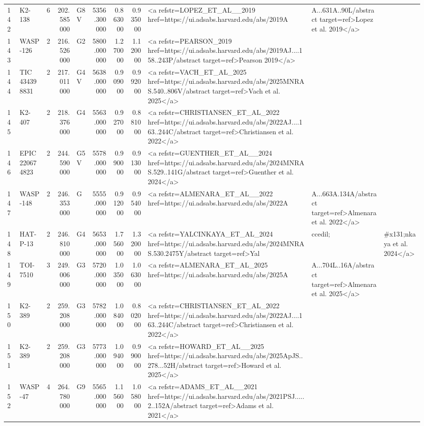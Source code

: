 \begin{tabular}{llrrlrrrl}
142 & K2-138 & 6 & 202.585000 & G8 V & 5356.300000 & 0.863000 & 0.935000 & <a refstr=LOPEZ_ET_AL__2019 href=https://ui.adsabs.harvard.edu/abs/2019A&A...631A..90L/abstract target=ref>Lopez et al. 2019</a> \\
143 & WASP-126 & 2 & 216.526000 & G2 & 5800.000000 & 1.270000 & 1.120000 & <a refstr=PEARSON_2019 href=https://ui.adsabs.harvard.edu/abs/2019AJ....158..243P/abstract target=ref>Pearson 2019</a> \\
144 & TIC 434398831 & 2 & 217.011000 & G4 V & 5638.000000 & 0.909000 & 0.992000 & <a refstr=VACH_ET_AL_2025 href=https://ui.adsabs.harvard.edu/abs/2025MNRAS.540..806V/abstract target=ref>Vach et al. 2025</a> \\
145 & K2-407 & 2 & 218.376000 & G4 & 5563.000000 & 0.927000 & 0.881000 & <a refstr=CHRISTIANSEN_ET_AL_2022 href=https://ui.adsabs.harvard.edu/abs/2022AJ....163..244C/abstract target=ref>Christiansen et al. 2022</a> \\
146 & EPIC 220674823 & 2 & 244.590000 & G5 V & 5578.000000 & 0.990000 & 0.913000 & <a refstr=GUENTHER_ET_AL__2024 href=https://ui.adsabs.harvard.edu/abs/2024MNRAS.529..141G/abstract target=ref>Guenther et al. 2024</a> \\
147 & WASP-148 & 2 & 246.353000 & G & 5555.000000 & 0.912000 & 0.954000 & <a refstr=ALMENARA_ET_AL__2022 href=https://ui.adsabs.harvard.edu/abs/2022A&A...663A.134A/abstract target=ref>Almenara et al. 2022</a> \\
148 & HAT-P-13 & 2 & 246.810000 & G4 & 5653.000000 & 1.756000 & 1.320000 & <a refstr=YALCINKAYA_ET_AL_2024 href=https://ui.adsabs.harvard.edu/abs/2024MNRAS.530.2475Y/abstract target=ref>Yal&ccedil;&#x131;nkaya et al. 2024</a> \\
149 & TOI-7510 & 3 & 249.006000 & G3 & 5720.000000 & 1.035000 & 1.063000 & <a refstr=ALMENARA_ET_AL_2025 href=https://ui.adsabs.harvard.edu/abs/2025A&A...704L..16A/abstract target=ref>Almenara et al. 2025</a> \\
150 & K2-389 & 2 & 259.208000 & G3 & 5782.000000 & 1.084000 & 0.802000 & <a refstr=CHRISTIANSEN_ET_AL_2022 href=https://ui.adsabs.harvard.edu/abs/2022AJ....163..244C/abstract target=ref>Christiansen et al. 2022</a> \\
151 & K2-389 & 2 & 259.208000 & G3 & 5773.000000 & 1.094000 & 0.990000 & <a refstr=HOWARD_ET_AL__2025 href=https://ui.adsabs.harvard.edu/abs/2025ApJS..278...52H/abstract target=ref>Howard et al. 2025</a> \\
152 & WASP-47 & 4 & 264.780000 & G9 & 5565.000000 & 1.156000 & 1.058000 & <a refstr=ADAMS_ET_AL__2021 href=https://ui.adsabs.harvard.edu/abs/2021PSJ.....2..152A/abstract target=ref>Adams et al. 2021</a> \\

\end{tabular}
